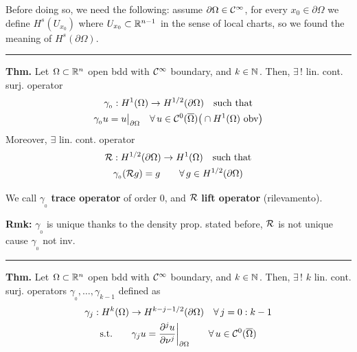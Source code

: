 \begin{Figure}
\end{Figure}

Before doing so, we need the following: assume $\partial\Omega\in\mathcal{C}^\infty$, for every $x_0\in\partial\Omega$ we define $H^s(U_{x_0})$ where $U_{x_0}\subset\mathbb{R}^{n-1}$ in the sense of local charts, so we found the meaning of $H^s(\partial\Omega)$.

\rule{0.31\textwidth}{0.2pt}
\smallskip

\textbf{Thm.} Let $\Omega\subset\mathbb{R}^n$ open bdd with $\mathcal{C}^\infty$ boundary, and $k\in\mathbb{N}$. Then, $\exists\,!$ lin. cont. surj. operator 
\begin{gather*}
\gamma_{_0}:H^1(\Omega)\to H^{1/2}(\partial\Omega)\quad\text{such that} \\
\gamma_{_0} u=u\big|_{\partial\Omega}\quad\forall\, u\in\mathcal{C}^0(\overline{\Omega})\big(\cap H^1(\Omega)\text{ obv}\big)
\end{gather*}
Moreover, $\exists$ lin. cont. operator 
\begin{gather*}
\mathcal{R}:H^{1/2}(\partial\Omega)\to H^1(\Omega)\quad\text{such that} \\
\gamma_{_0}(\mathcal{R} g)=g\qquad\forall\, g\in H^{1/2}(\partial\Omega)
\end{gather*}

We call $\gamma_{_0}$ \textbf{trace operator} of order 0, and $\mathcal{R}$ \textbf{lift operator} (rilevamento).

\smallskip

\textbf{Rmk:} $\gamma_{_0}$ is unique thanks to the density prop. stated before, $\mathcal{R}$ is not unique cause $\gamma_{_0}$ not inv.

\rule{0.31\textwidth}{0.2pt}
\smallskip

\textbf{Thm.} Let $\Omega\subset\mathbb{R}^n$ open bdd with $\mathcal{C}^\infty$ boundary, and $k\in\mathbb{N}$. Then, $\exists\,!$ $k$ lin. cont. surj. operators $\gamma_{_0},\dots,\gamma_{k-1}$ defined as
\begin{gather*}
\gamma_j:H^k(\Omega)\to H^{k-j-1/2}(\partial\Omega)\quad\forall\,j=0:k-1\\
\text{s.t.}\qquad
\gamma_j u=\frac{\partial^j u}{\partial\nu^j} \bigg|_{\partial\Omega}\qquad\forall\, u\in \mathcal{C}^0(\overline{\Omega})
\end{gather*}

